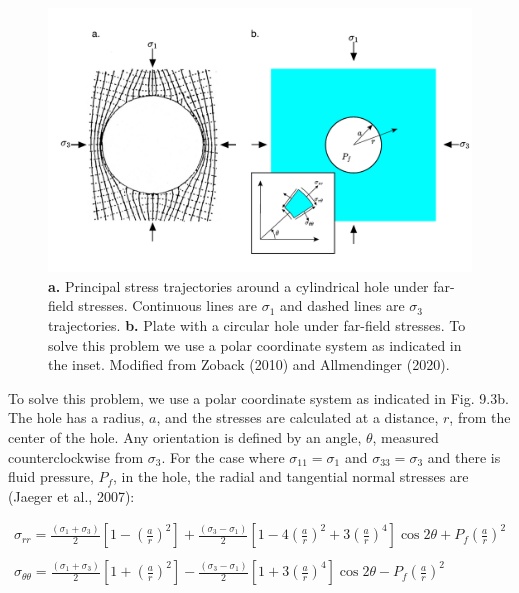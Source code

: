 \documentclass[a4paper , 12pt]{book}
\begin{document}
\begin{figure}[ht]
    \centering
    \includegraphics[width=14cm]{ch9f3.pdf}
    \caption{\textbf{a.} Principal stress trajectories around a cylindrical hole under far-field stresses. Continuous lines are $\sigma_1$ and dashed lines are $\sigma_3$ trajectories. \textbf{b.} Plate with a circular hole under far-field stresses. To solve this problem we use a polar coordinate system as indicated in the inset. Modified from Zoback (2010) and Allmendinger (2020).}
\end{figure}

To solve this problem, we use a polar coordinate system as indicated in Fig. 9.3b. The hole has a radius, $a$, and the stresses are calculated at a distance, $r$, from the center of the hole. Any orientation is defined by an angle, $\theta$, measured counterclockwise from $\sigma_3$. For the case where $\sigma_{11} = \sigma_1$ and $\sigma_{33} = \sigma_3$ and there is fluid pressure, $P_f$, in the hole, the radial and tangential normal stresses are (Jaeger et al., 2007):

\begin{equation}
    \begin{gathered}
        \sigma_{r r}=\frac{\left(\sigma_{1}+\sigma_{3}\right)}{2}\left[1-\left(\frac{a}{r}\right)^{2}\right]+\frac{\left(\sigma_{3}-\sigma_{1}\right)}{2}\left[1-4\left(\frac{a}{r}\right)^{2}+3\left(\frac{a}{r}\right)^{4}\right] \cos 2 \theta+P_{f}\left(\frac{a}{r}\right)^{2} \\ \\
        \sigma_{\theta \theta}=\frac{\left(\sigma_{1}+\sigma_{3}\right)}{2}\left[1+\left(\frac{a}{r}\right)^{2}\right]-\frac{\left(\sigma_{3}-\sigma_{1}\right)}{2}\left[1+3\left(\frac{a}{r}\right)^{4}\right] \cos 2 \theta-P_{f}\left(\frac{a}{r}\right)^{2}
    \end{gathered}
\end{equation}
\end{document}
